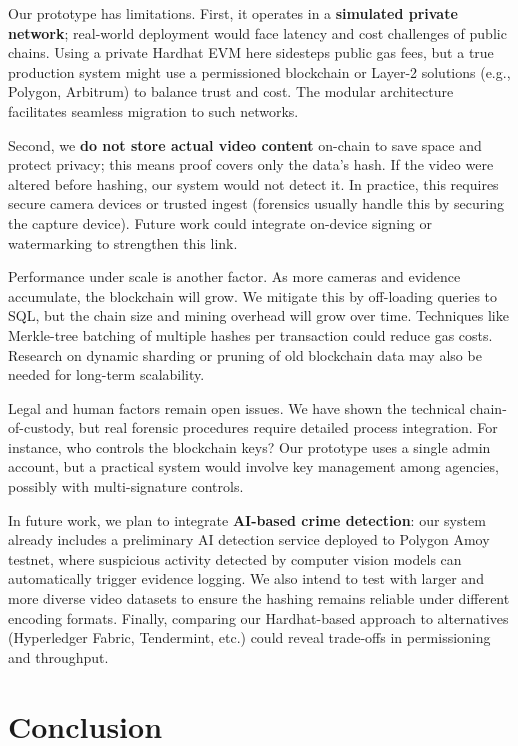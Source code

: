 \documentclass[conference]{IEEEtran}
\begin{document}
Our prototype has limitations. First, it operates in a \textbf{simulated private network}; real-world deployment would face latency and cost challenges of public chains. Using a private Hardhat EVM here sidesteps public gas fees, but a true production system might use a permissioned blockchain or Layer-2 solutions (e.g., Polygon, Arbitrum) to balance trust and cost. The modular architecture facilitates seamless migration to such networks.

Second, we \textbf{do not store actual video content} on-chain to save space and protect privacy; this means proof covers only the data's hash. If the video were altered before hashing, our system would not detect it. In practice, this requires secure camera devices or trusted ingest (forensics usually handle this by securing the capture device). Future work could integrate on-device signing or watermarking to strengthen this link.

Performance under scale is another factor. As more cameras and evidence accumulate, the blockchain will grow. We mitigate this by off-loading queries to SQL, but the chain size and mining overhead will grow over time. Techniques like Merkle-tree batching of multiple hashes per transaction could reduce gas costs. Research on dynamic sharding or pruning of old blockchain data may also be needed for long-term scalability.

Legal and human factors remain open issues. We have shown the technical chain-of-custody, but real forensic procedures require detailed process integration. For instance, who controls the blockchain keys? Our prototype uses a single admin account, but a practical system would involve key management among agencies, possibly with multi-signature controls.

In future work, we plan to integrate \textbf{AI-based crime detection}: our system already includes a preliminary AI detection service deployed to Polygon Amoy testnet, where suspicious activity detected by computer vision models can automatically trigger evidence logging. We also intend to test with larger and more diverse video datasets to ensure the hashing remains reliable under different encoding formats. Finally, comparing our Hardhat-based approach to alternatives (Hyperledger Fabric, Tendermint, etc.) could reveal trade-offs in permissioning and throughput.

\section{Conclusion}
\end{document}
